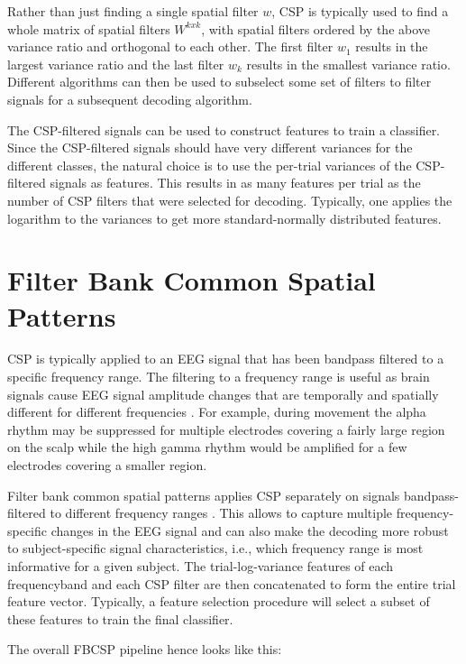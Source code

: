     Rather than just finding a single spatial filter $w$, CSP is typically
used to find a whole matrix of spatial filters $W^{kxk}$, with spatial
filters ordered by the above variance ratio and orthogonal to each
other. The first filter $w_1$ results in the largest variance ratio
and the last filter $w_k$ results in the smallest variance ratio.
Different algorithms can then be used to subselect some set of filters
to filter signals for a subsequent decoding algorithm.

The CSP-filtered signals can be used to construct features to train a
classifier. Since the CSP-filtered signals should have very different
variances for the different classes, the natural choice is to use the
per-trial variances of the CSP-filtered signals as features. This
results in as many features per trial as the number of CSP filters that
were selected for decoding. Typically, one applies the logarithm to the
variances to get more standard-normally distributed features.


\section{Filter Bank Common Spatial
Patterns}\label{filter-bank-common-spatial-patterns}

    CSP is typically applied to an EEG signal that has been bandpass
filtered to a specific frequency range. The filtering to a frequency
range is useful as brain signals cause EEG signal amplitude changes that
are temporally and spatially different for different frequencies
\citep{ang_filter_2008}. For example, during movement the
alpha rhythm may be suppressed for multiple electrodes covering a fairly
large region on the scalp while the high gamma rhythm would be amplified
for a few electrodes covering a smaller region.

    Filter bank common spatial patterns applies CSP separately on signals
bandpass-filtered to different frequency ranges
\cite{ang_filter_2008,chin_multi-class_2009}. This allows
to capture multiple frequency-specific changes in the EEG signal and can
also make the decoding more robust to subject-specific signal
characteristics, i.e., which frequency range is most informative for a
given subject. The trial-log-variance features of each frequencyband and
each CSP filter are then concatenated to form the entire trial feature
vector. Typically, a feature selection procedure will select a subset of
these features to train the final classifier.

    The overall FBCSP pipeline hence looks like this:

